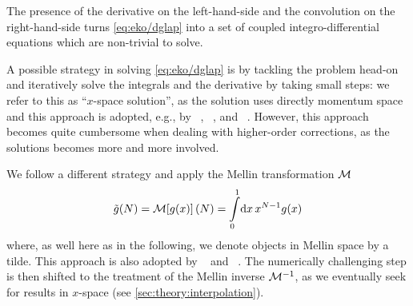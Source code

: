 The presence of the derivative on the left-hand-side and the convolution on the
right-hand-side turns \cref{eq:eko/dglap} into a set of coupled
integro-differential equations which are non-trivial to solve.

A possible strategy in solving \cref{eq:eko/dglap} is by tackling the problem
head-on and iteratively solve the integrals and the derivative by taking small
steps: we refer to this as \enquote{$x$-space solution}, as the solution uses
directly momentum space and this approach is adopted, e.g., by \apfel{}~\cite{Bertone:2013vaa},
\hoppet{}~\cite{Salam:2008qg}, and \qcdnum{}~\cite{Botje:2010ay}.
However, this approach becomes quite cumbersome when dealing with higher-order
corrections, as the solutions becomes more and more involved.

We follow a different strategy and apply the Mellin transformation $\mathcal{M}$
\begin{equation}
    \tilde g(N) = \mathcal{M}\qty[g(x)](N) = \int\limits_0^1\!\dd{x} x^{N-1} g(x)
\end{equation}
where, as well here as in the following, we denote objects in Mellin space by a
tilde.
This approach is also adopted by \pegasus{}~\cite{Vogt:2004ns} and \fk{}~\cite{Ball:2008by,Ball:2010de,DelDebbio:2007ee}.
The numerically challenging step is then shifted to the treatment of the Mellin
inverse $\mathcal{M}^{-1}$, as we eventually seek for results in $x$-space (see
\cref{sec:theory:interpolation}).
